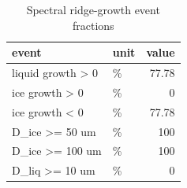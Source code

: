 \begin{table}[htbp]
\centering
\small
\caption{Spectral ridge-growth event fractions}
\label{tab:growth_bundle_events}
\begin{tabular}{llr}
\toprule
event & unit & value \\
\midrule
liquid growth > 0 & \% & 77.78 \\
ice growth > 0 & \% & 0 \\
ice growth < 0 & \% & 77.78 \\
D\_ice >= 50 um & \% & 100 \\
D\_ice >= 100 um & \% & 100 \\
D\_liq >= 10 um & \% & 0 \\
\bottomrule
\end{tabular}

\end{table}
